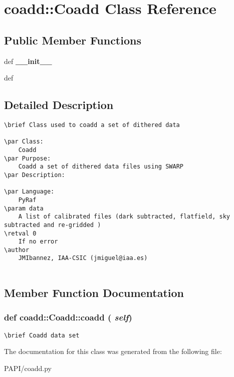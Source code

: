 \section{coadd::Coadd Class Reference}
\label{classcoadd_1_1Coadd}
\subsection*{Public Member Functions}
\begin{CompactItemize}
\item 
def \textbf{\_\-\_\-init\_\-\_\-}\label{classcoadd_1_1Coadd_77e0edb533aa5c7db54e1273aacc8d0b}

\item 
def {\bfcoadd}
\end{CompactItemize}


\subsection{Detailed Description}


\footnotesize\begin{verbatim}
\brief Class used to coadd a set of dithered data

\par Class:
    Coadd
\par Purpose:
    Coadd a set of dithered data files using SWARP
\par Description:
        
\par Language:
    PyRaf
\param data
    A list of calibrated files (dark subtracted, flatfield, sky subtracted and re-gridded )
\retval 0
    If no error
\author
    JMIbannez, IAA-CSIC (jmiguel@iaa.es)
    
\end{verbatim}
\normalsize
 



\subsection{Member Function Documentation}
\subsubsection{\setlength{\rightskip}{0pt plus 5cm}def coadd::Coadd::coadd ( {\em self})}\label{classcoadd_1_1Coadd_9bc3e004ec96691a4ee01eecd152ab95}




\footnotesize\begin{verbatim}
\brief Coadd data set 
\end{verbatim}
\normalsize
 

The documentation for this class was generated from the following file:\begin{CompactItemize}
\item 
PAPI/coadd.py\end{CompactItemize}
